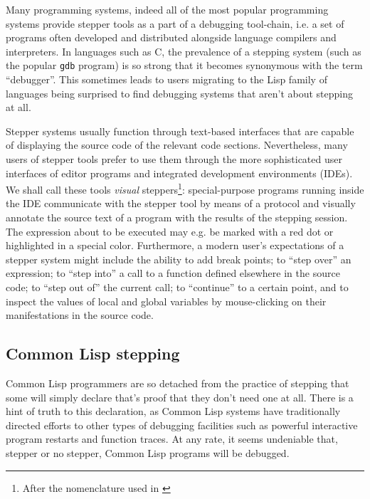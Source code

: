 \documentclass[sigconf]{acmart}
\begin{document}
Many programming systems, indeed all of the most popular programming
systems provide stepper tools as a part of a debugging tool-chain,
i.e. a set of programs often developed and distributed alongside
language compilers and interpreters.  In languages such as C, the
prevalence of a stepping system (such as the popular \texttt{gdb}
program) is so strong that it becomes synonymous with the term
``debugger''. This sometimes leads to users migrating to the Lisp
family of languages being surprised to find debugging systems that
aren't about stepping at all.

Stepper systems usually function through text-based interfaces that
are capable of displaying the source code of the relevant code
sections.  Nevertheless, many users of stepper tools prefer to use
them through the more sophisticated user interfaces of editor programs
and integrated development environments (IDEs).  We shall call these
tools \emph{visual} steppers\footnote{After the nomenclature used in
  \cite{annotation-based}}: special-purpose programs running inside
the IDE communicate with the stepper tool by means of a protocol and
visually annotate the source text of a program with the results of the
stepping session.  The expression about to be executed may e.g. be
marked with a red dot or highlighted in a special color.  Furthermore,
a modern user's expectations of a stepper system might include the
ability to add break points; to ``step over'' an expression; to ``step
into'' a call to a function defined elsewhere in the source code; to
``step out of'' the current call; to ``continue'' to a certain point,
and to inspect the values of local and global variables by
mouse-clicking on their manifestations in the source code.

\subsection{Common Lisp stepping}


Common Lisp programmers are so detached from the practice of stepping
that some will simply declare that's proof that they don't need one at
all.  There is a hint of truth to this declaration, as Common Lisp
systems have traditionally directed efforts to other types of
debugging facilities such as powerful interactive program restarts and
function traces.  At any rate, it seems undeniable that, stepper or no
stepper, Common Lisp programs will be debugged.
\end{document}
